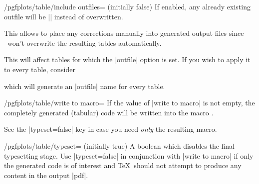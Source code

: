 \begin{key}{/pgfplots/table/include outfiles= (initially false)}
	If enabled, any already existing outfile will be || instead of overwritten.
\begin{codeexample}
\end{codeexample}
	This allows to place any corrections manually into generated output files since \PGFPlotstable\ won't overwrite the resulting tables automatically.

	This will affect tables for which the |outfile| option is set. If you wish to apply it to every table, consider
\begin{codeexample}
\end{codeexample}
	\noindent which will generate an |outfile| name for every table.
\end{key}

\begin{key}{/pgfplots/table/write to macro=}
	If the value of |write to macro| is not empty, the completely generated (tabular) code will be written into the macro .

	See the |typeset=false| key in case you need \emph{only} the resulting macro.
\end{key}


\begin{key}{/pgfplots/table/typeset= (initially true)}
	A boolean which disables the final typesetting stage. Use |typeset=false| in conjunction with |write to macro| if only the generated code is of interest and \TeX\ should not attempt to produce any content in the output |pdf|.	
\end{key}

